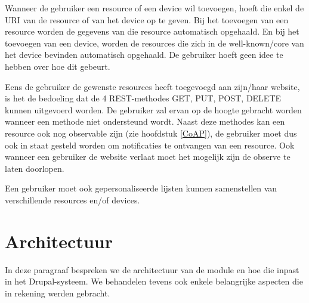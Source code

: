 Wanneer de gebruiker een resource of een device wil toevoegen, hoeft die enkel de URI van de resource of van het device op te geven. Bij het toevoegen van een resource worden de gegevens van die resource automatisch opgehaald. En bij het toevoegen van een device, worden de resources die zich in de well-known/core van het device bevinden automatisch opgehaald. De gebruiker hoeft geen idee te hebben over hoe dit gebeurt.

Eens de gebruiker de gewenste resources heeft toegevoegd aan zijn/haar website, is het de bedoeling dat de 4 REST-methodes GET, PUT, POST, DELETE kunnen uitgevoerd worden. De gebruiker zal ervan op de hoogte gebracht worden wanneer een methode niet ondersteund wordt. Naast deze methodes kan een resource ook nog observable zijn (zie hoofdstuk \ref{CoAP}), de gebruiker moet dus ook in staat gesteld worden om notificaties te ontvangen van een resource. Ook wanneer een gebruiker de website verlaat moet het mogelijk zijn de observe te laten doorlopen.

Een gebruiker moet ook gepersonaliseerde lijsten kunnen samenstellen van verschillende resources en/of devices.

\section{Architectuur}
In deze paragraaf bespreken we de architectuur van de module en hoe die inpast in het Drupal-systeem. We behandelen tevens ook enkele belangrijke aspecten die in rekening werden gebracht. %

